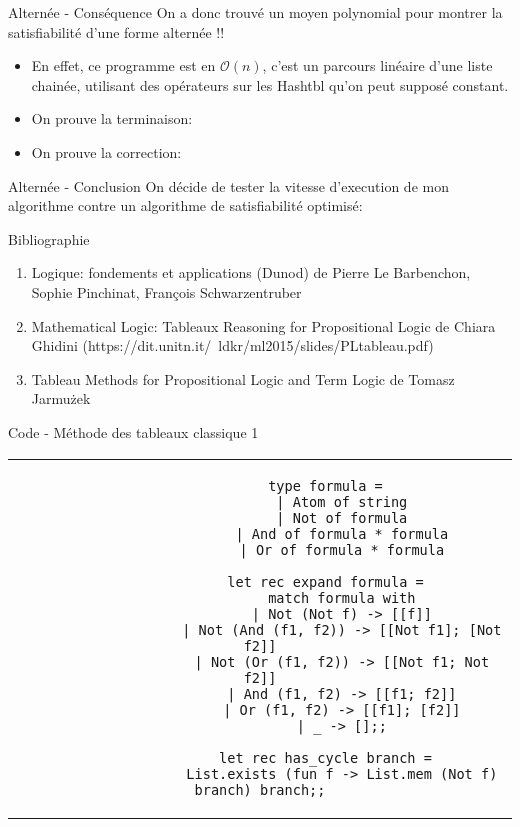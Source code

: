 \documentclass[]{beamer}
\begin{document}
\begin{frame}{Alternée - Conséquence}
    On a donc trouvé un moyen polynomial pour montrer la satisfiabilité d'une forme alternée !!
    \pause
    \begin{itemize}
        \item En effet, ce programme est en $\mathcal{O}(n)$, c'est un parcours linéaire d'une liste chainée, utilisant des opérateurs sur les Hashtbl qu'on peut supposé constant.
        \item On prouve la terminaison: 
        \item On prouve la correction: 
    \end{itemize}
\end{frame}

\begin{frame}{Alternée - Conclusion}
    On décide de tester la vitesse d'execution de mon algorithme contre un algorithme de satisfiabilité optimisé:
    
\end{frame}


\begin{frame}{Bibliographie}
\begin{enumerate}
    \item Logique: fondements et applications (Dunod) de Pierre Le Barbenchon, Sophie Pinchinat, François Schwarzentruber
    \item Mathematical Logic: Tableaux Reasoning for Propositional Logic de Chiara Ghidini (https://dit.unitn.it/~ldkr/ml2015/slides/PLtableau.pdf)
    \item Tableau Methods  for Propositional Logic and Term Logic de Tomasz Jarmużek
\end{enumerate}
\end{frame}

\begin{frame}[fragile]{Code - Méthode des tableaux classique 1}
    \begin{center}
        \begin{tabular}{c}
            \begin{lstlisting}
                type formula =
                    | Atom of string
                    | Not of formula
                    | And of formula * formula
                    | Or of formula * formula

                let rec expand formula =
                    match formula with
                    | Not (Not f) -> [[f]]
                    | Not (And (f1, f2)) -> [[Not f1]; [Not f2]]
                    | Not (Or (f1, f2)) -> [[Not f1; Not f2]]
                    | And (f1, f2) -> [[f1; f2]]
                    | Or (f1, f2) -> [[f1]; [f2]]
                    | _ -> [];;

                let rec has_cycle branch =
                    List.exists (fun f -> List.mem (Not f) branch) branch;;
            \end{lstlisting}
        \end{tabular}
      \end{center}
\end{frame}
\end{document}
